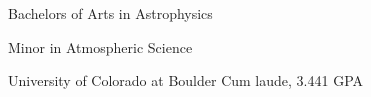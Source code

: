 {}
{Bachelors of Arts in Astrophysics

Minor in Atmospheric Science} %
{University of Colorado at Boulder} %
{Cum laude, 3.441 GPA}
{}

